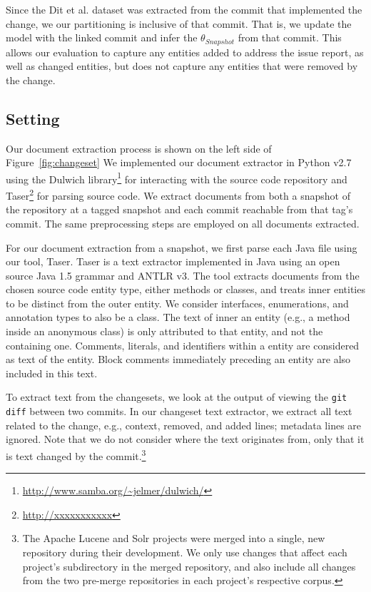 Since the Dit et al. dataset was extracted from the commit that implemented the change,
we our partitioning is inclusive of that commit.
That is, we update the model with the linked commit and infer the
$\theta_{Snapshot}$ from that commit.
This allows our evaluation to capture any entities added to address the issue report,
as well as changed entities,
but does not capture any entities that were removed by the change.





\subsection{Setting}

Our document extraction process is shown on the left side of Figure~\ref{fig:changeset}
We implemented our document extractor in Python v2.7
using the Dulwich library\footnote{\url{http://www.samba.org/~jelmer/dulwich/}}
for interacting with the source code repository and
Taser\footnote{\url{http://xxxxxxxxxxx}} for parsing source code.
We extract documents from both a snapshot of the repository at a tagged
snapshot and each commit reachable from that tag's commit.
The same preprocessing steps are employed on all documents extracted.

For our document extraction from a snapshot, we first parse each Java file using our tool, Taser.
Taser is a text extractor implemented in Java using an open source Java 1.5 grammar and ANTLR v3.
The tool extracts documents from the chosen source code entity type,
either methods or classes, and treats inner entities to be distinct from the outer entity.
We consider interfaces, enumerations, and annotation types to also be a class.
The text of inner an entity (e.g., a method inside an anonymous class)
is only attributed to that entity, and not the containing one.
Comments, literals, and identifiers within a entity are considered as text of the entity.
Block comments immediately preceding an entity are also included in this text.

To extract text from the changesets, we look at the output of viewing
the \texttt{git diff} between two commits.
In our changeset text extractor, we extract all text related to the
change, e.g., context, removed, and added lines; metadata lines are ignored.
Note that we do not consider where the text originates from,
only that it is text changed by the commit.\footnote{
The Apache Lucene and Solr projects were merged into a single, new repository
during their development.
We only use changes that affect each project's subdirectory in the merged repository,
and also include all changes from the two pre-merge repositories in each project's respective corpus.
}

